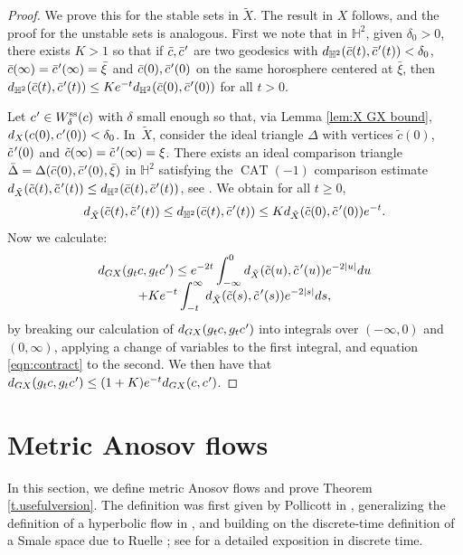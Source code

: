 \documentclass[11pt]{article}
\newcommand{\cpr}{c\mkern1mu'}
\newcommand{\bcpr}{\bar c\mkern1mu'}
\newcommand{\tcpr}{\tilde c\mkern2mu'}
\newcommand{\sts}{\mathrm{ss}}
\theoremstyle{definition}
\numberwithin{equation}{section}
\DeclareMathOperator{\CAT}{CAT}
\begin{document}
\begin{proof}
We prove this for the stable sets in $\tilde X$. The result in $X$ follows, and the proof for the unstable sets is analogous. First we note that in $\mathbb{H}^2$, given $\delta_0>0$, there exists $K>1$ so that if $\bar c, \bcpr$ are two geodesics with $d_{\mathbb{H}^2}(\bar c(t), \bcpr(t) ) < \delta_0$, $\bar c(\infty)= \bcpr(\infty) = \bar \xi$ and $\bar c(0), \bcpr(0)$ on the same horosphere centered at $\bar \xi$, then $d_{\mathbb{H}^2}(\bar c(t), \bcpr(t) ) \leq K e^{-t} d_{\mathbb{H}^2}(\bar c(0), \bcpr(0)) $ for all $t>0$.

Let $\cpr \in W^{\sts}_\delta(c)$ with $\delta$ small enough so that, via Lemma \ref{lem:X GX bound}, $d_X( c(0), \cpr(0)) <\delta_0 $. In~$\tilde X$, consider the ideal triangle $\Delta$ with vertices $ \tilde c(0)$, $\tcpr(0)$ and \hbox{$\tilde c(\infty)= \tcpr(\infty)=\xi$}.
There exists an ideal comparison triangle $\bar\Delta= \Delta(\bar c(0), \bcpr(0), \bar\xi)$ in $\mathbb{H}^2$ satisfying the $\CAT(-1)$ comparison estimate $d_{\tilde X}(\tilde c(t), \tcpr(t)) \leq d_{\mathbb{H}^2}(\bar c(t), \bcpr(t))$, see \cite[Prop.\,4.4.13]{das-simmons-urbanski}. We obtain for all $t\geq 0$,
\begin{equation}\label{eqn:contract}
d_{\tilde X}(\tilde c(t), \tcpr(t)) \leq d_{\mathbb{H}^2}(\bar c(t), \bcpr(t)) \leq K d_{\tilde X}(\tilde c(0),\tcpr(0)) e^{-t}.
\end{equation}
Now we calculate:
\begin{multline*}
d_{G X}(g_t c, g_t \cpr) \leq e^{-2t} \int_{-\infty}^0 d_{\tilde X}(\tilde c(u),\tcpr(u)) e^{-2|u|}du\\[-8pt]
+ K e^{-t} \int_{-t}^\infty d_{\tilde X}(\tilde c(s),\tcpr(s)) e^{-2|s|} ds,
\end{multline*}
by breaking our calculation of $d_{G X}(g_t c, g_t \cpr)$ into integrals over $(-\infty,0)$ and $(0,\infty)$, applying a change of variables to the first integral, and equation \eqref{eqn:contract} to the second. We then have that $d_{G X}(g_t c, g_t \cpr) \leq (1+K)e^{-t} d_{G X}(c,\cpr)$.
\end{proof}

\section{Metric Anosov flows}\label{sec:Markov}

In this section, we define metric Anosov flows and prove Theorem \ref{t.usefulversion}. The definition was first given by Pollicott in \cite{pollicott}, generalizing the definition of a hyperbolic flow in \cite{bowen-periodic, bowen-symbolic}, and building on the discrete-time definition of a Smale space due to Ruelle \cite{Ruelle}; see \cite{iP2014} for a detailed exposition in discrete time.
\end{document}

